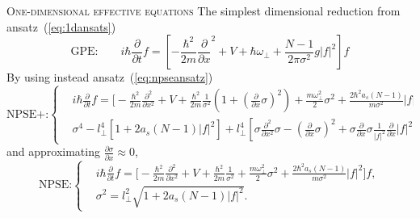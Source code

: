 \documentclass[final]{beamer}
\newlength{\colwidth}
\begin{document}
\begin{frame}[t]
\begin{columns}[t]
\begin{column}{\colwidth}
      \begin{block}{\textsc{One-dimensional effective equations}}
        The simplest dimensional reduction from ansatz~(\ref{eq:1dansats})
        \begin{equation}
          \text{GPE:} \qquad i\hbar \frac{\partial}{\partial t} f = \left[-\dfrac{\hbar^2}{2m} \frac{\partial}{\partial x}^2  + V + \hbar\omega_\perp+ \dfrac{N-1}{2\pi \sigma^2} g|f|^2 \right]f
        \end{equation}
        By using instead ansatz~(\ref{eq:npseansatz})
        \begin{equation}
          \text{NPSE+:}\left\{\begin{split}
              &      i \hbar \frac{\partial}{\partial t} f = \bigg[- \frac{\hbar^2}{2 m} \frac{\partial^2}{\partial x^2} + V + \frac{\hbar^2}{2m} \frac{1}{\sigma^2}\left(1+ \left(\frac{\partial}{\partial x} \sigma\right)^2 \right) +\frac{m\omega_\perp^2}{2}\sigma^2 + \frac{2 \hbar^2 a_s (N-1)}{m \sigma^2}|f|^2 \bigg]f, \\
          &\sigma^4 - l_\perp^4\left[1 + 2a_s{ (N-1)}|f|^2\right]
          +l_\perp^4\left[\sigma \frac{\partial^2}{\partial x^2} \sigma -\left(\frac{\partial}{\partial x}\sigma\right)^2 +\sigma \frac{\partial}{\partial x}\sigma \frac{1}{|f|^2}\frac{\partial}{\partial x} |f|^2 \right] = 0,
        \end{split} \right.
        \end{equation}
        and approximating $\frac{\partial \sigma}{\partial x} \approx 0$, 
        \begin{equation}
          \text{NPSE:}\left\{\begin{split}
              & i \hbar \frac{\partial}{\partial t} f = \bigg[- \frac{\hbar^2}{2 m} \frac{\partial^2}{\partial x^2} + V +\frac{\hbar^2}{2m} \frac{1}{\sigma^2} + \frac{m\omega_\perp^2}{2}\sigma^2 + \frac{2 \hbar^2 a_s (N-1)}{m \sigma^2}|f|^2 \bigg]f, \\
          &\sigma^2 = l_\perp^2\sqrt{1+ 2a_s(N-1)|f|^2}.
        \end{split} \right.
        \end{equation} 


\end{block}
\end{column}
\end{columns}
\end{frame}
\end{document}
